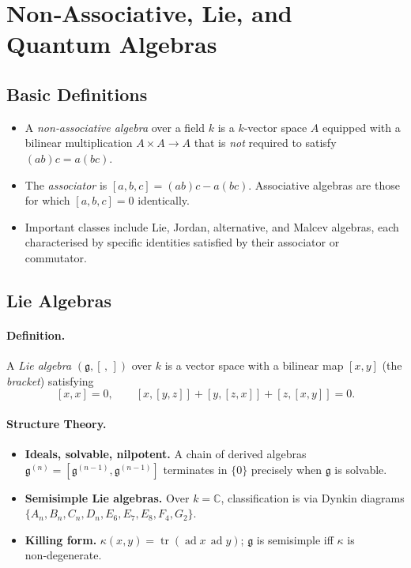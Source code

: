 \section{Non‑Associative, Lie, and Quantum Algebras}\label{sec:algebras}

\subsection{Basic Definitions}

\begin{itemize}
    \item A \emph{non‑associative algebra} over a field \(k\) is a \(k\)-vector space \(A\) equipped with a bilinear multiplication \(A\times A\!\to\!A\) that is \emph{not} required to satisfy \((ab)c = a(bc)\).
    \item The \emph{associator} is \([a,b,c]=(ab)c-a(bc)\).  
          Associative algebras are those for which \([a,b,c]=0\) identically.
    \item Important classes include Lie, Jordan, alternative, and Malcev algebras, each characterised by specific identities satisfied by their associator or commutator.
\end{itemize}

\subsection{Lie Algebras}

\paragraph{Definition.}
A \emph{Lie algebra} \((\mathfrak{g},[\,,\,])\) over \(k\) is a vector space with a bilinear map \( [x,y] \) (the \emph{bracket}) satisfying
\[
[x,x]=0,\qquad
[x,[y,z]]+[y,[z,x]]+[z,[x,y]]=0.
\]

\paragraph{Structure Theory.}
\begin{itemize}
    \item \textbf{Ideals, solvable, nilpotent.}  
          A chain of derived algebras \(\mathfrak{g}^{(n)}=[\mathfrak{g}^{(n-1)},\mathfrak{g}^{(n-1)}]\) terminates in \(\{0\}\) precisely when \(\mathfrak{g}\) is solvable.
    \item \textbf{Semisimple Lie algebras.}  
          Over \(k=\mathbb{C}\), classification is via Dynkin diagrams \(\{A_n,B_n,C_n,D_n,E_6,E_7,E_8,F_4,G_2\}\).
    \item \textbf{Killing form.}  
          \(\kappa(x,y)=\operatorname{tr}(\operatorname{ad}x\,\operatorname{ad}y)\); \(\mathfrak{g}\) is semisimple iff \(\kappa\) is non‑degenerate.
\end{itemize}

